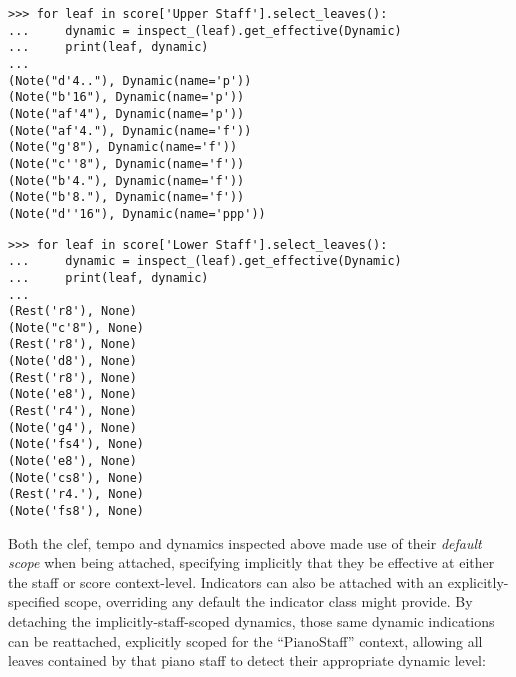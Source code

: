 \begin{abjadbookoutput}
\begin{singlespacing}
\vspace{-0.5\baselineskip}
\begin{lstlisting}
>>> for leaf in score['Upper Staff'].select_leaves():
...     dynamic = inspect_(leaf).get_effective(Dynamic)
...     print(leaf, dynamic)
...
(Note("d'4.."), Dynamic(name='p'))
(Note("b'16"), Dynamic(name='p'))
(Note("af'4"), Dynamic(name='p'))
(Note("af'4."), Dynamic(name='f'))
(Note("g'8"), Dynamic(name='f'))
(Note("c''8"), Dynamic(name='f'))
(Note("b'4."), Dynamic(name='f'))
(Note("b'8."), Dynamic(name='f'))
(Note("d''16"), Dynamic(name='ppp'))
\end{lstlisting}
\begin{lstlisting}
>>> for leaf in score['Lower Staff'].select_leaves():
...     dynamic = inspect_(leaf).get_effective(Dynamic)
...     print(leaf, dynamic)
...
(Rest('r8'), None)
(Note("c'8"), None)
(Rest('r8'), None)
(Note('d8'), None)
(Rest('r8'), None)
(Note('e8'), None)
(Rest('r4'), None)
(Note('g4'), None)
(Note('fs4'), None)
(Note('e8'), None)
(Note('cs8'), None)
(Rest('r4.'), None)
(Note('fs8'), None)
\end{lstlisting}
\end{singlespacing}
\end{abjadbookoutput}

\noindent Both the clef, tempo and dynamics inspected above made use of their
\emph{default scope} when being attached, specifying implicitly that they be
effective at either the staff or score context-level. Indicators can also be
attached with an explicitly-specified scope, overriding any default the
indicator class might provide. By detaching the
implicitly-staff-scoped dynamics, those same dynamic indications can be
reattached, explicitly scoped for the \enquote{PianoStaff} context, allowing
all leaves contained by that piano staff to detect their appropriate dynamic
level:

\begin{comment}
<abjad>
piano_dynamic = detach(Dynamic, score['Voice 1'][0][0])[0]
forte_dynamic = detach(Dynamic, score['Voice 1'][1][0])[0]
attach(piano_dynamic, score['Voice 1'][0][0], scope='PianoStaff')
attach(forte_dynamic, score['Voice 1'][1][0], scope='PianoStaff')
for leaf in score['Upper Staff'].select_leaves():
    dynamic = inspect_(leaf).get_effective(Dynamic)
    print(leaf, dynamic)

for leaf in score['Lower Staff'].select_leaves():
    dynamic = inspect_(leaf).get_effective(Dynamic)
    print(leaf, dynamic)

</abjad>
\end{comment}

